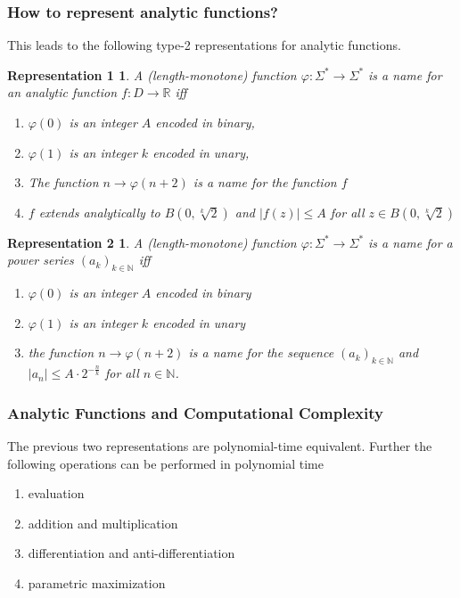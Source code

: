 \documentclass[xcolor=pdftex,dvipsnames,table,handout]{beamer}
\newcommand{\N}{\ensuremath{\mathbb{N}}}
\newcommand{\R}{\ensuremath{\mathbb{R}}}
\newcommand{\abs}[1]{\left|#1\right|}
\newtheorem{representation1}{Representation 1}
\newtheorem{representation2}{Representation 2}
\begin{document}
\begin{frame}
\frametitle{How to represent analytic functions?}
This leads to the following type-2 representations for analytic functions.
\begin{representation1}
  A (length-monotone) function $\varphi: \Sigma^* \to \Sigma^*$ is a name for an analytic function $f:D \to \R$ iff
  \begin{enumerate}
  \item $\varphi(0)$ is an integer $A$ encoded in binary,
  \item $\varphi(1)$ is an integer $k$ encoded in unary,
  \item The function $n \to \varphi(n+2)$ is a name for the function $f$
  \item $f$ extends analytically to $B(0, \sqrt[k]{2})$ and $\abs{f(z)} \leq A$ for all $z \in B(0, \sqrt[k]{2})$
  \end{enumerate}

\end{representation1}

\begin{representation2}
  A (length-monotone) function $\varphi: \Sigma^* \to \Sigma^*$ is a name for a power series $(a_k)_{k \in \N}$ iff
  \begin{enumerate}
  \item $\varphi(0)$ is an integer $A$ encoded in binary
  \item $\varphi(1)$ is an integer $k$ encoded in unary
  \item the function $n \to \varphi(n+2)$ is a name for the sequence $(a_k)_{k \in \N}$ and
  $\abs{a_n} \leq A \cdot 2^{-\frac{n}{k}}$ for all $n \in \N$.
  \end{enumerate}
\end{representation2}
\end{frame}
\begin{frame}[<+->]
\frametitle{Analytic Functions and Computational Complexity}
\begin{theorem}
  The previous two representations are polynomial-time equivalent.
  Further the following operations can be performed in polynomial time
\begin{enumerate}
\item evaluation
\item addition and multiplication
\item differentiation and anti-differentiation
\item parametric maximization
\end{enumerate}
\end{theorem}
\end{frame}
\end{document}
